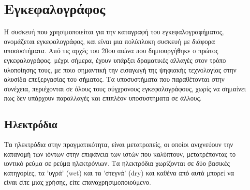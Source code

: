 \documentclass[11pt,a4paper,english,greek,twoside]{../Thesis}
\begin{document}
\section{Εγκεφαλογράφος}
Η συσκευή που χρησιμοποιείται για την καταγραφή του εγκεφαλογραφήματος, ονομάζεται εγκεφαλογράφος, και είναι μια πολύπλοκη συσκευή με διάφορα υποσυστήματα. Από τις αρχές του 20ου αιώνα που δημιουργήθηκε ο πρώτος εγκεφαλογράφος, μέχρι σήμερα, έχουν υπάρξει δραματικές αλλαγές στον τρόπο υλοποίησης τους, με ποιο σημαντική την εισαγωγή της ψηφιακής τεχνολογίας στην αλυσίδα επεξεργασίας του σήματος. Τα υποσυστήματα που παραθέτονται στην συνέχεια, περιέχονται σε όλους τους σύγχρονους εγκεφαλογράφους, χωρίς να σημαίνει πως δεν υπάρχουν παραλλαγές και επιπλέον υποσυστήματα σε άλλους.

\subsection{Ηλεκτρόδια}
  Tα ηλεκτρόδια στην πραγματικότητα, είναι μετατροπείς, οι οποίοι ανιχνεύουν την κατανομή των ιόντων στην επιφάνεια των ιστών που καλύπτουν, μετατρέποντας το ιοντικό ρεύμα σε ρεύμα ηλεκτρόνιων. Τα ηλεκτρόδια χωρίζονται σε δύο βασικές κατηγορίες, τα 'υγρά' (wet) και τα 'στεγνά' (dry) και καθένα από αυτά μπορεί να είναι είτε μιας χρήσης, είτε επαναχρησιμοποιούμενο. 
\end{document}
